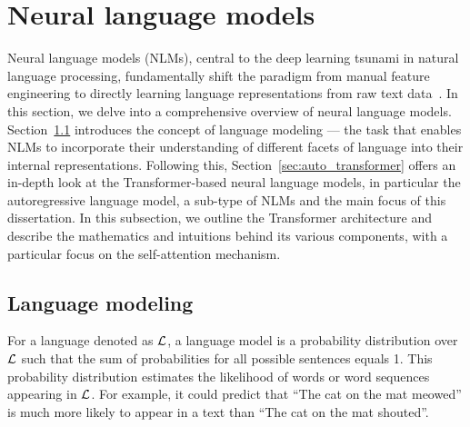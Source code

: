\section{Neural language models}\label{sec:nlms}

Neural language models (NLMs), central to the deep learning tsunami in natural language processing, fundamentally shift the paradigm from manual feature engineering to directly learning language  representations from raw text data~\citep{manning-2015-last}. In this section, we delve into a comprehensive overview of neural language models. Section~\ref{sec:lm_tasks} introduces the concept of language modeling --- the task that enables NLMs to incorporate their understanding of different facets of language into their internal representations. Following this, Section~\ref{sec:auto_transformer} offers an in-depth look at the Transformer-based neural language models, in particular the autoregressive language model, a sub-type of NLMs and the main focus of this dissertation. In this subsection, we outline the Transformer architecture and describe the mathematics and intuitions behind its various components, with a particular focus on the self-attention mechanism.


\subsection{Language modeling} \label{sec:lm_tasks}

For a language denoted as ${\cal L}$, a language model is a probability distribution over ${\cal L}$ such that the sum of probabilities for all possible sentences equals 1. This probability distribution estimates the likelihood of words or word sequences appearing in ${\cal L}$. For example, it could predict that ``The cat on the mat meowed'' is much more likely to appear in a text than ``The cat on the mat shouted''. 

